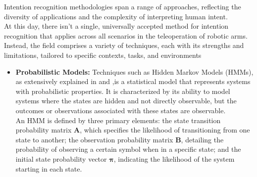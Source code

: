 Intention recognition methodologies span a range of approaches, reflecting the diversity of applications and the complexity of interpreting human intent.\\
At this day, there isn't a single, universally accepted method for intention recognition that applies across all scenarios in the teleoperation of robotic arms. Instead, the field comprises a variety of techniques, each with its strengths and limitations, tailored to specific contexts, tasks, and environments
\begin{itemize}
    \item\textbf{Probabilistic Models:} Techniques such as Hidden Markov Models (HMMs), as extensively explained in \cite{5480475} and \cite{AARNO2008692},is a statistical model that represents systems with probabilistic properties.
    It is characterized by its ability to model systems where the states are hidden and not directly observable, but the outcomes or observations associated with these states are observable.\\
    An HMM is defined by three primary elements: the state transition probability matrix $\textbf{A}$, which specifies the likelihood of transitioning from one state to another; the observation probability matrix $\textbf{B}$, detailing the probability of observing a certain symbol when in a specific state; and the initial state probability vector $\boldsymbol{\pi}$, indicating the likelihood of the system starting in each state.\\
    

    

    
    \begin{figure}[ht]
    \centering
    \begin{adjustbox}{center} 
\end{adjustbox}
\end{figure}
\end{itemize}
